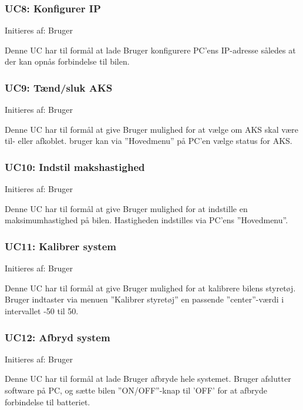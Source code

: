 \subsubsection{UC8: Konfigurer IP}
Initieres af: Bruger

Denne UC har til formål at lade Bruger konfigurere PC'ens IP-adresse således at der kan opnås forbindelse til bilen.  

\subsubsection{UC9: Tænd/sluk AKS}
Initieres af: Bruger

Denne UC har til formål at give Bruger mulighed for at vælge om AKS skal være til- eller afkoblet. bruger kan via ''Hovedmenu'' på PC'en vælge status for AKS. 

\subsubsection{UC10: Indstil makshastighed}
Initieres af: Bruger

Denne UC har til formål at give Bruger mulighed for at indstille en maksimumhastighed på bilen. Hastigheden indstilles via PC'ens ''Hovedmenu''.

\subsubsection{UC11: Kalibrer system}
Initieres af: Bruger

Denne UC har til formål at give Bruger mulighed for at kalibrere bilens styretøj. Bruger indtaster via menuen ''Kalibrer styretøj'' en passende ''center''-værdi i intervallet -50 til 50.  

\subsubsection{UC12: Afbryd system}
Initieres af: Bruger

Denne UC har til formål at lade Bruger afbryde hele systemet. Bruger afslutter software på PC, og sætte bilen ''ON/OFF''-knap til 'OFF' for at afbryde forbindelse til batteriet. 
\clearpage



\clearpage

